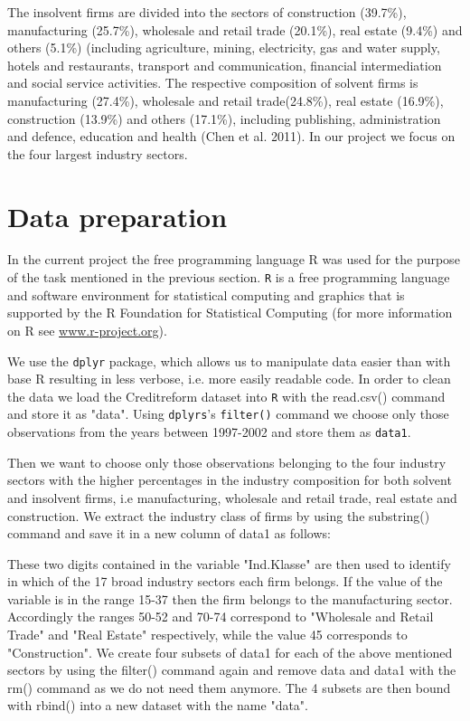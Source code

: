 \documentclass{article}
\begin{document}
The insolvent firms are divided into the sectors of construction (39.7\%), manufacturing (25.7\%), wholesale and retail trade (20.1\%), real estate (9.4\%) and others (5.1\%) (including agriculture, mining, electricity, gas and water supply, hotels and restaurants, transport and communication, financial intermediation and social service activities. The respective composition of solvent firms is manufacturing (27.4\%), wholesale and retail trade(24.8\%), real estate (16.9\%), construction (13.9\%) and others (17.1\%), including publishing, administration and defence, education and health (Chen et al. 2011). In our project we focus on the four largest industry sectors.

\section{Data preparation}

In the current project the free programming language R was used for the purpose of the task mentioned in the previous section. \texttt{R} is a free programming language and software environment for statistical computing and graphics that is supported by the R Foundation for Statistical Computing (for more information on R see \url{www.r-project.org}).

We use the \texttt{dplyr} package, which allows us to manipulate data easier than with base R resulting in less verbose, i.e. more easily readable code. In order to clean the data we load the Creditreform dataset into \texttt{R} with the read.csv() command and store it as "data". Using \texttt{dplyrs}'s \texttt{filter()} command we choose only those observations from the years between 1997-2002 and store them as \texttt{data1}.

Then we want to choose only those observations belonging to the four industry sectors with the higher percentages in the industry composition for both solvent and insolvent firms, i.e manufacturing, wholesale and retail trade, real estate and construction. We extract the industry class of firms by using the substring() command and save it in a new column of data1 as follows:



These two digits contained in the variable "Ind.Klasse" are then used to identify in which of the 17 broad industry sectors each firm belongs. If the value of the variable is in the range 15-37 then the firm belongs to the manufacturing sector. Accordingly the ranges 50-52 and 70-74 correspond to "Wholesale and Retail Trade" and "Real Estate" respectively, while the value 45 corresponds to "Construction". We create four subsets of data1 for each of the above mentioned sectors by using the filter() command again and remove data and data1 with the rm() command as we do not need them anymore. The 4 subsets are then bound with rbind() into a new dataset with the name "data". 
\end{document}
